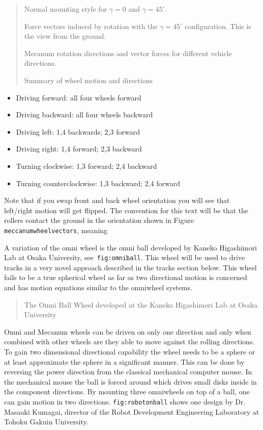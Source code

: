 \begin{quote}
Normal mounting style for \(\gamma = 0\) and \(\gamma = 45^\circ\).

Force vectors induced by rotation with the \(\gamma = 45^\circ\)
configuration. This is the view from the ground.

Mecanum rotation directions and vector forces for different vehicle
directions.

Summary of wheel motion and directions
\end{quote}

\begin{itemize}
\tightlist
\item
  Driving forward: all four wheels forward
\item
  Driving backward: all four wheels backward
\item
  Driving left: 1,4 backwards; 2,3 forward
\item
  Driving right: 1,4 forward; 2,3 backward
\item
  Turning clockwise: 1,3 forward; 2,4 backward
\item
  Turning counterclockwise: 1,3 backward; 2,4 forward
\end{itemize}

Note that if you swap front and back wheel orientation you will see that
left/right motion will get flipped. The convention for this text will be
that the rollers contact the ground in the orientation shown in Figure
\texttt{meccanumwheelvectors}, meaning

A variation of the omni wheel is the omni ball developed by Kaneko
Higashimori Lab at Osaka University, see~\texttt{fig:omniball}. This
wheel will be used to drive tracks in a very novel approach described in
the tracks section below. This wheel fails to be a true spherical wheel
as far as two directional motion is concerned and has motion equations
similar to the omniwheel systems.

\begin{quote}
The Omni Ball Wheel developed at the Kaneko Higashimori Lab at Osaka
University
\end{quote}

Omni and Mecanum wheels can be driven on only one direction and only
when combined with other wheels are they able to move against the
rolling directions. To gain two dimensional directional capability the
wheel needs to be a sphere or at least approximate the sphere in a
significant manner. This can be done by reversing the power direction
from the classical mechanical computer mouse. In the mechanical mouse
the ball is forced around which drives small disks inside in the
component directions. By mounting three omniwheels on top of a ball, one
can gain motion in two directions. \texttt{fig:robotonball} shows one
design by Dr. Masaaki Kumagai, director of the Robot Development
Engineering Laboratory at Tohoku Gakuin University.

